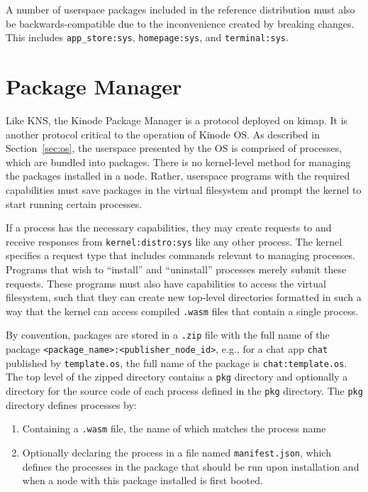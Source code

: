 \documentclass[runningheads]{llncs}
\begin{document}
A number of userspace packages included in the reference distribution must also be backwards-compatible due to the inconvenience created by breaking changes.
This includes \verb|app_store:sys|, \verb|homepage:sys|, and \verb|terminal:sys|.

\section{Package Manager}
\label{sec:packagemanager}

Like KNS, the Kinode Package Manager is a protocol deployed on kimap.
It is another protocol critical to the operation of Kinode OS.
As described in Section~\ref{sec:os}, the userspace presented by the OS is comprised of processes, which are bundled into packages.
There is no kernel-level method for managing the packages installed in a node.
Rather, userspace programs with the required capabilities must save packages in the virtual filesystem and prompt the kernel to start running certain processes.

If a process has the necessary capabilities, they may create requests to and receive responses from \verb|kernel:distro:sys| like any other process.
The kernel specifies a request type that includes commands relevant to managing processes.
Programs that wish to ``install'' and ``uninstall'' processes merely submit these requests.
These programs must also have capabilities to access the virtual filesystem, such that they can create new top-level directories formatted in such a way that the kernel can access compiled \verb|.wasm| files that contain a single process.

By convention, packages are stored in a \verb|.zip| file with the full name of the package \verb|<package_name>:<publisher_node_id>|, e.g., for a chat app \verb|chat| published by \verb|template.os|, the full name of the package is \verb|chat:template.os|.
The top level of the zipped directory contains a \verb|pkg| directory and optionally a directory for the source code of each process defined in the \verb|pkg| directory.
The \verb|pkg| directory defines processes by:
\begin{enumerate}
    \item Containing a \verb|.wasm| file, the name of which matches the process name
    \item Optionally declaring the process in a file named \verb|manifest.json|, which defines the processes in the package that should be run upon installation and when a node with this package installed is first booted.
\end{enumerate}
\end{document}
